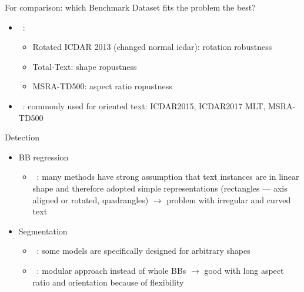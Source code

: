 For comparison: which Benchmark Dataset fits the problem the best?
\begin{itemize}
    \item~\cite{liao_mask_2020}:
        \begin{itemize}
            \item Rotated ICDAR 2013 (changed normal icdar): rotation robustness
            \item Total-Text: shape ropustness
            \item MSRA-TD500: aspect ratio ropustness
        \end{itemize}
    \item~\cite{yang_learning_2021}: commonly used for oriented text: ICDAR2015, ICDAR2017 MLT,
        MSRA-TD500
\end{itemize}

Detection
\begin{itemize}
    \item BB regression
        \begin{itemize}
            \item~\cite{ferrari_textsnake_2018}: many methods have strong assumption that text
                instances are in linear shape and therefore adopted simple representations
                (rectangles --- axis aligned or rotated, quadrangles)
                $\rightarrow$ problem with irregular and curved text
        \end{itemize}
    \item Segmentation
        \begin{itemize}
            \item~\cite{ferrari_textsnake_2018}: some models are specifically designed for
                arbitrary shapes
            \item~\cite{shi_detecting_2017}: modular approach instead of whole \acp{BB}
                $\rightarrow$ good with long aspect ratio and orientation because of flexibility
        \end{itemize}
\end{itemize}

